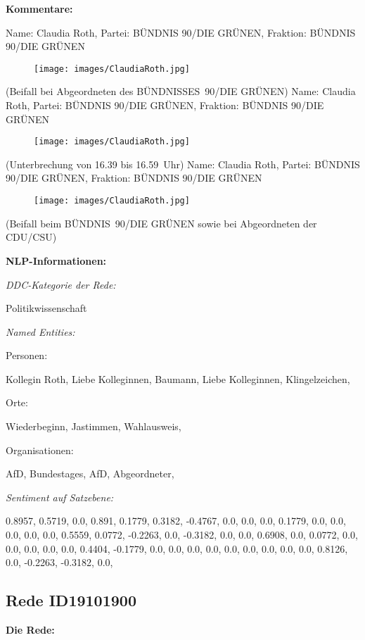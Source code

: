 \documentclass[10pt, a4paper]{report}
\begin{document}
\textbf{Kommentare:}

Name: Claudia Roth, Partei: BÜNDNIS 90/DIE GRÜNEN, Fraktion: BÜNDNIS 90/DIE GRÜNEN

\begin{figure}[!ht]
\texttt{[image: images/ClaudiaRoth.jpg]}
\end{figure}


(Beifall bei Abgeordneten des BÜNDNISSES 90/DIE GRÜNEN)
Name: Claudia Roth, Partei: BÜNDNIS 90/DIE GRÜNEN, Fraktion: BÜNDNIS 90/DIE GRÜNEN

\begin{figure}[!ht]
\texttt{[image: images/ClaudiaRoth.jpg]}
\end{figure}


(Unterbrechung von 16.39 bis 16.59 Uhr)
Name: Claudia Roth, Partei: BÜNDNIS 90/DIE GRÜNEN, Fraktion: BÜNDNIS 90/DIE GRÜNEN

\begin{figure}[!ht]
\texttt{[image: images/ClaudiaRoth.jpg]}
\end{figure}


(Beifall beim BÜNDNIS 90/DIE GRÜNEN sowie bei Abgeordneten der CDU/CSU)


\textbf{NLP-Informationen:}

\textit{DDC-Kategorie der Rede:}

Politikwissenschaft

\textit{Named Entities:}

Personen:

Kollegin Roth, Liebe Kolleginnen, Baumann, Liebe Kolleginnen, Klingelzeichen, 

Orte:

Wiederbeginn, Jastimmen, Wahlausweis, 

Organisationen:

AfD, Bundestages, AfD, Abgeordneter, 

\textit{Sentiment auf Satzebene:}

0.8957, 0.5719, 0.0, 0.891, 0.1779, 0.3182, -0.4767, 0.0, 0.0, 0.0, 0.1779, 0.0, 0.0, 0.0, 0.0, 0.0, 0.5559, 0.0772, -0.2263, 0.0, -0.3182, 0.0, 0.0, 0.6908, 0.0, 0.0772, 0.0, 0.0, 0.0, 0.0, 0.0, 0.4404, -0.1779, 0.0, 0.0, 0.0, 0.0, 0.0, 0.0, 0.0, 0.0, 0.0, 0.8126, 0.0, -0.2263, -0.3182, 0.0, 
\subsection{Rede ID19101900}

\textbf{Die Rede:}
\end{document}
